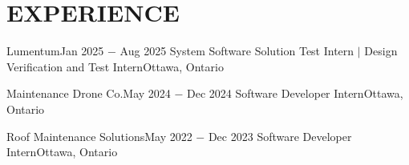 \section{\textbf {\large EXPERIENCE}}
\resumeSubHeadingListStart %

    \resumeSubheading %
    {Lumentum}{Jan 2025 $-$ Aug 2025}
    {System Software Solution Test Intern $|$ Design Verification and Test Intern}{Ottawa, Ontario}
    \resumeItemListStart %
        \resumeItem{}
        \resumeItem{}
        \resumeItem{}
    \resumeItemListEnd %
    
    \resumeSubheading %
    {Maintenance Drone Co.}{May 2024 $-$ Dec 2024}
    {Software Developer Intern}{Ottawa, Ontario}
    \resumeItemListStart %
        \resumeItem{}
        \resumeItem{}
        \resumeItem{}
    \resumeItemListEnd %

    \resumeSubheading %
    {Roof Maintenance Solutions}{May 2022 $-$ Dec 2023}
    {Software Developer Intern}{Ottawa, Ontario}
    \resumeItemListStart %
        \resumeItem{}
        \resumeItem{}
        \resumeItem{}
    \resumeItemListEnd %
    

\resumeSubHeadingListEnd %